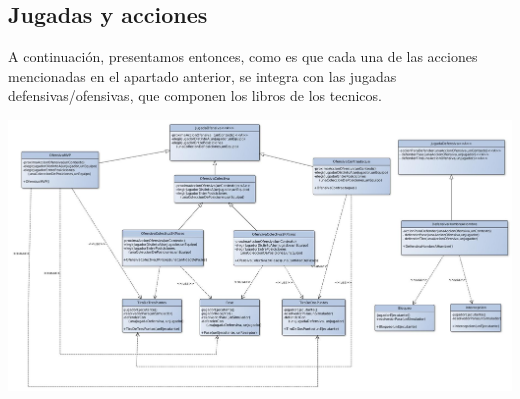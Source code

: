\subsection{Jugadas y acciones}
A continuación, presentamos entonces, como es que cada una de las acciones mencionadas en el apartado anterior, se integra con las jugadas defensivas/ofensivas, que componen los libros de los tecnicos.
\begin{center}
\includegraphics[scale=0.35]{diseno/jugadasYAcciones.jpg}
\end{center}



